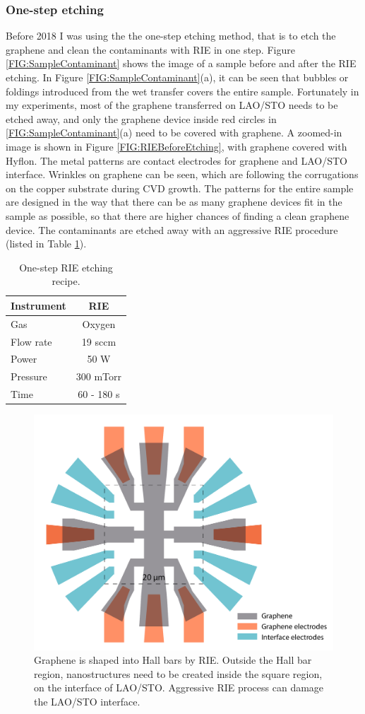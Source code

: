 \documentclass[pdflatex, sectionletters, 12pt]{pittetd}    %
\begin{document}
\subsubsection{One-step etching}

Before 2018 I was using the the one-step etching method, that is to etch the graphene and clean the contaminants with RIE in one step. Figure \ref{FIG:SampleContaminant} shows the image of a sample before and after the RIE etching. In Figure \ref{FIG:SampleContaminant}(a), it can be seen that bubbles or foldings introduced from the wet transfer covers the entire sample. Fortunately in my experiments, most of the graphene transferred on LAO/STO needs to be etched away, and only the graphene device inside red circles in \ref{FIG:SampleContaminant}(a) need to be covered with graphene. A zoomed-in image is shown in Figure \ref{FIG:RIEBeforeEtching}, with graphene covered with Hyflon. The metal patterns are contact electrodes for graphene and LAO/STO interface. Wrinkles on graphene can be seen, which are following the corrugations on the copper substrate during CVD growth. The patterns for the entire sample are designed in the way that there can be as many graphene devices fit in the sample as possible, so that there are higher chances of finding a clean graphene device. The contaminants are etched away with an aggressive RIE procedure (listed in Table \ref{TAB:RIESingleStep}). 

\begin{table}
	\centering
	\begin{tabular}{l|c}
		\hline
		Instrument	& RIE \\ \hline
		Gas	&	Oxygen \\ 
		Flow rate	&	19 sccm	\\ 
		Power & 50 W \\
		Pressure	&	300 mTorr	\\
		Time	&	60 - 180 s \\ \hline
	\end{tabular}
	\caption{One-step RIE etching recipe.}
	\label{TAB:RIESingleStep}
\end{table}

\begin{figure}[h!]
	\centering
	\includegraphics[width=.70\textwidth]{Drawing/GCOCanvas.pdf}
	\caption{Graphene is shaped into Hall bars by RIE. Outside the Hall bar region, nanostructures need to be created inside the square region, on the interface of LAO/STO. Aggressive RIE process can damage the LAO/STO interface.}
	\label{FIG:GCOCanvas}
\end{figure}
\end{document}
